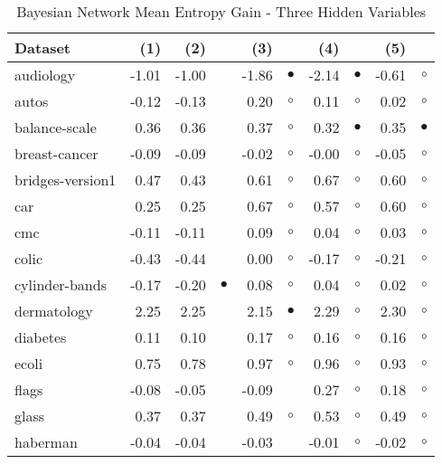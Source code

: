 \newpage
{\centering \footnotesize \begin{longtable}{lrr@{\hspace{0.1cm}}cr@{\hspace{0.1cm}}cr@{\hspace{0.1cm}}cr@{\hspace{0.1cm}}c}
\caption{\label{bnmeg3}Bayesian Network Mean Entropy Gain - Three Hidden Variables}
\\
\hline
Dataset & (1)& (2) & & (3) & & (4) & & (5) & \\
\hline
audiology & -1.01 & -1.00 &           & -1.86 & $\bullet$ & -2.14 & $\bullet$ & -0.61 &   $\circ$\\
autos & -0.12 & -0.13 &           &  0.20 &   $\circ$ &  0.11 &   $\circ$ &  0.02 &   $\circ$\\
balance-scale &  0.36 &  0.36 &           &  0.37 &   $\circ$ &  0.32 & $\bullet$ &  0.35 & $\bullet$\\
breast-cancer & -0.09 & -0.09 &           & -0.02 &   $\circ$ & -0.00 &   $\circ$ & -0.05 &   $\circ$\\
bridges-version1 &  0.47 &  0.43 &           &  0.61 &   $\circ$ &  0.67 &   $\circ$ &  0.60 &   $\circ$\\
car &  0.25 &  0.25 &           &  0.67 &   $\circ$ &  0.57 &   $\circ$ &  0.60 &   $\circ$\\
cmc & -0.11 & -0.11 &           &  0.09 &   $\circ$ &  0.04 &   $\circ$ &  0.03 &   $\circ$\\
colic & -0.43 & -0.44 &           &  0.00 &   $\circ$ & -0.17 &   $\circ$ & -0.21 &   $\circ$\\
cylinder-bands & -0.17 & -0.20 & $\bullet$ &  0.08 &   $\circ$ &  0.04 &   $\circ$ &  0.02 &   $\circ$\\
dermatology &  2.25 &  2.25 &           &  2.15 & $\bullet$ &  2.29 &   $\circ$ &  2.30 &   $\circ$\\
diabetes &  0.11 &  0.10 &           &  0.17 &   $\circ$ &  0.16 &   $\circ$ &  0.16 &   $\circ$\\
ecoli &  0.75 &  0.78 &           &  0.97 &   $\circ$ &  0.96 &   $\circ$ &  0.93 &   $\circ$\\
flags & -0.08 & -0.05 &           & -0.09 &           &  0.27 &   $\circ$ &  0.18 &   $\circ$\\
glass &  0.37 &  0.37 &           &  0.49 &   $\circ$ &  0.53 &   $\circ$ &  0.49 &   $\circ$\\
haberman & -0.04 & -0.04 &           & -0.03 &           & -0.01 &   $\circ$ & -0.02 &   $\circ$\\

\end{longtable}}

